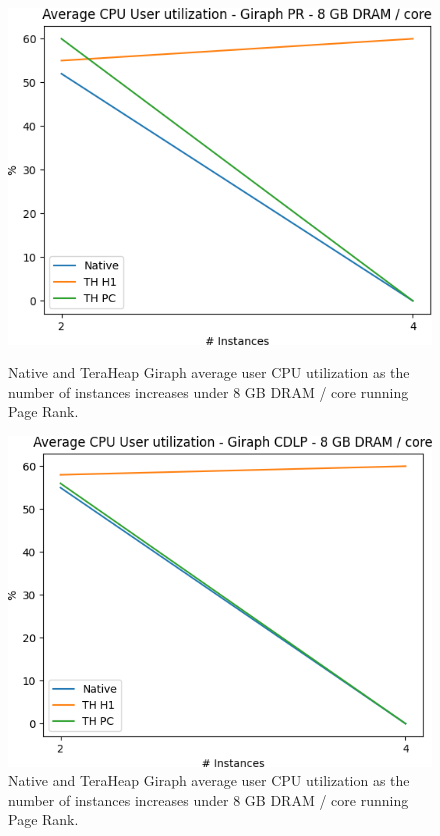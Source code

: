 \begin{figure}[thbp]
	\centering
        \includegraphics[width=\linewidth]{./fig/G_PR_128_USR.png}
    \caption{Native and TeraHeap Giraph average user CPU utilization
        as the number of instances increases under 8 GB DRAM / core running Page Rank.}
        \label{fig:g_pr_128_usr}
        \includegraphics[width=\linewidth]{./fig/G_CDLP_128_USR.png}
    \caption{Native and TeraHeap Giraph average user CPU utilization
        as the number of instances increases under 8 GB DRAM / core running Page Rank.}
        \label{fig:g_cdlp_128_usr}
\end{figure}

